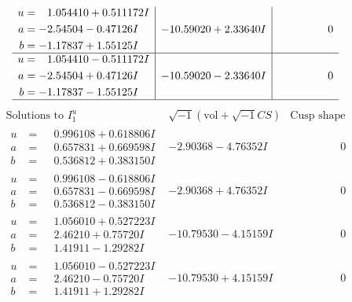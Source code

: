\documentclass[1p]{elsarticle_modified}
\theoremstyle{definition}
\newcommand{\I}{\sqrt{-1}}
\begin{document}
$$\begin{array}{c|c|c}
\begin{aligned}
u &= \phantom{-}1.054410 + 0.511172 I \\
a &= -2.54504 - 0.47126 I \\
b &= -1.17837 + 1.55125 I\end{aligned}
 & -10.59020 + 2.33640 I & \phantom{-0.000000 } 0 \\ \hline\begin{aligned}
u &= \phantom{-}1.054410 - 0.511172 I \\
a &= -2.54504 + 0.47126 I \\
b &= -1.17837 - 1.55125 I\end{aligned}
 & -10.59020 - 2.33640 I & \phantom{-0.000000 } 0\\
 \hline 
 \end{array}$$\newpage$$\begin{array}{c|c|c}  
\text{Solutions to }I^u_{1}& \I (\text{vol} + \sqrt{-1}CS) & \text{Cusp shape}\\
 \hline 
\begin{aligned}
u &= \phantom{-}0.996108 + 0.618806 I \\
a &= \phantom{-}0.657831 + 0.669598 I \\
b &= \phantom{-}0.536812 + 0.383150 I\end{aligned}
 & -2.90368 - 4.76352 I & \phantom{-0.000000 } 0 \\ \hline\begin{aligned}
u &= \phantom{-}0.996108 - 0.618806 I \\
a &= \phantom{-}0.657831 - 0.669598 I \\
b &= \phantom{-}0.536812 - 0.383150 I\end{aligned}
 & -2.90368 + 4.76352 I & \phantom{-0.000000 } 0 \\ \hline\begin{aligned}
u &= \phantom{-}1.056010 + 0.527223 I \\
a &= \phantom{-}2.46210 + 0.75720 I \\
b &= \phantom{-}1.41911 - 1.29282 I\end{aligned}
 & -10.79530 - 4.15159 I & \phantom{-0.000000 } 0 \\ \hline\begin{aligned}
u &= \phantom{-}1.056010 - 0.527223 I \\
a &= \phantom{-}2.46210 - 0.75720 I \\
b &= \phantom{-}1.41911 + 1.29282 I\end{aligned}
 & -10.79530 + 4.15159 I & \phantom{-0.000000 } 0 \\ \hline\begin{aligned}

\end{aligned}
\end{array}$$
\end{document}
